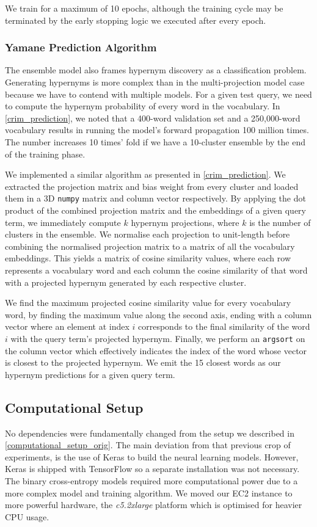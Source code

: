 We train for a maximum of 10 epochs, although the training cycle may be terminated by the early stopping logic we executed after every epoch.

\subsubsection{Yamane Prediction Algorithm} \label{yamane_prediction}
The ensemble model also frames hypernym discovery as a classification problem.  Generating hypernyms is more complex than in the multi-projection model case because we have to contend with multiple models.  For a given test query, we need to compute the 
hypernym probability of every word in the vocabulary.  In \cref{crim_prediction}, we noted that a 400-word validation set and a 250,000-word vocabulary results in running the model's forward propagation 100 million times.  The number increases 10 times' fold if we have a 10-cluster ensemble by the end of the training phase.  

We implemented a similar algorithm as presented in \cref{crim_prediction}.  We extracted the projection matrix and bias weight from every cluster and loaded them in a 3D \texttt{numpy} matrix and column vector respectively.  By applying the dot product of the combined projection matrix and the embeddings of a given query term, we immediately compute $k$ hypernym projections, where $k$ is the number of clusters in the ensemble.  We normalise each projection to unit-length before combining the normalised projection matrix to a matrix of all the vocabulary embeddings.  This yields a matrix of cosine similarity values, where each row represents a vocabulary word and each column the cosine similarity of that word with a projected hypernym generated by each respective cluster.

We find the maximum projected cosine similarity value for every vocabulary word, by finding the maximum value along the second axis, ending with a column vector where an element at index $i$ corresponds to the final similarity of the word $i$ with the query term's projected hypernym.  Finally, we perform an \texttt{argsort} on the column vector which effectively indicates the index of the word whose vector is closest to the projected hypernym.  We emit the 15 closest words as our hypernym predictions for a given query term.

\subsection{Computational Setup}
No dependencies were fundamentally changed from the setup we described in \cref{computational_setup_orig}.  The main deviation from that previous crop of experiments, is the use of Keras to build the neural learning models.  However, Keras is shipped with TensorFlow so a separate installation was not necessary.  The binary cross-entropy models required more computational power due to a more complex model and training algorithm.  We moved our EC2 instance to more powerful hardware, the \textit{c5.2xlarge} platform which is optimised for heavier CPU usage.


